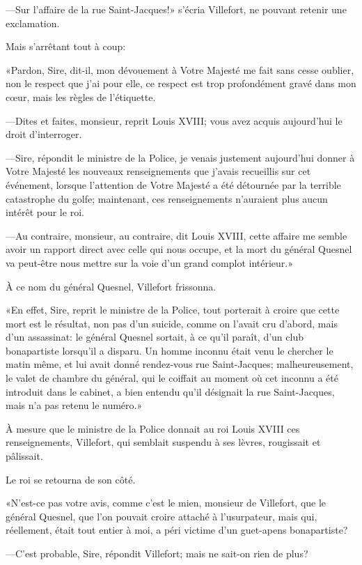—Sur l'affaire de la rue Saint-Jacques!» s'écria Villefort, ne pouvant retenir une exclamation.

Mais s'arrêtant tout à coup:

«Pardon, Sire, dit-il, mon dévouement à Votre Majesté me fait sans cesse oublier, non le respect que j'ai pour elle, ce respect est trop profondément gravé dans mon cœur, mais les règles de l'étiquette.

—Dites et faites, monsieur, reprit Louis XVIII; vous avez acquis aujourd'hui le droit d'interroger.

—Sire, répondit le ministre de la Police, je venais justement aujourd'hui donner à Votre Majesté les nouveaux renseignements que j'avais recueillis sur cet événement, lorsque l'attention de Votre Majesté a été détournée par la terrible catastrophe du golfe; maintenant, ces renseignements n'auraient plus aucun intérêt pour le roi.

—Au contraire, monsieur, au contraire, dit Louis XVIII, cette affaire me semble avoir un rapport direct avec celle qui nous occupe, et la mort du général Quesnel va peut-être nous mettre sur la voie d'un grand complot intérieur.»

À ce nom du général Quesnel, Villefort frissonna.

«En effet, Sire, reprit le ministre de la Police, tout porterait à croire que cette mort est le résultat, non pas d'un suicide, comme on l'avait cru d'abord, mais d'un assassinat: le général Quesnel sortait, à ce qu'il paraît, d'un club bonapartiste lorsqu'il a disparu. Un homme inconnu était venu le chercher le matin même, et lui avait donné rendez-vous rue Saint-Jacques; malheureusement, le valet de chambre du général, qui le coiffait au moment où cet inconnu a été introduit dans le cabinet, a bien entendu qu'il désignait la rue Saint-Jacques, mais n'a pas retenu le numéro.»

À mesure que le ministre de la Police donnait au roi Louis XVIII ces renseignements, Villefort, qui semblait suspendu à ses lèvres, rougissait et pâlissait.

Le roi se retourna de son côté.

«N'est-ce pas votre avis, comme c'est le mien, monsieur de Villefort, que le général Quesnel, que l'on pouvait croire attaché à l'usurpateur, mais qui, réellement, était tout entier à moi, a péri victime d'un guet-apens bonapartiste?

—C'est probable, Sire, répondit Villefort; mais ne sait-on rien de plus?

